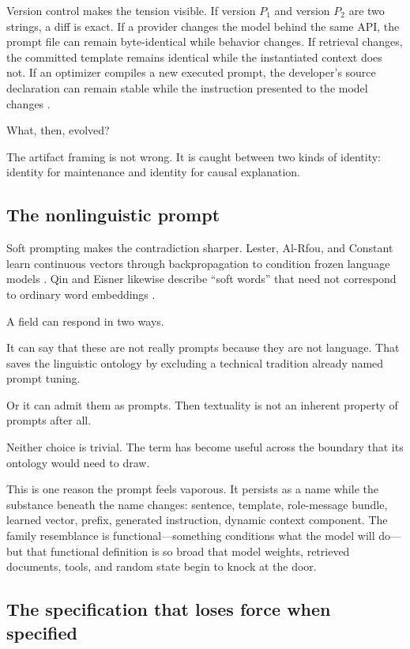 \documentclass[11pt]{article}
\begin{document}
Version control makes the tension visible. If version \(P_1\) and version \(P_2\) are two strings, a diff is exact. If a provider changes the model behind the same API, the prompt file can remain byte-identical while behavior changes. If retrieval changes, the committed template remains identical while the instantiated context does not. If an optimizer compiles a new executed prompt, the developer's source declaration can remain stable while the instruction presented to the model changes \citep{Khattab2023DSPy}.

What, then, evolved?

The artifact framing is not wrong. It is caught between two kinds of identity: identity for maintenance and identity for causal explanation.

\subsection{The nonlinguistic prompt}

Soft prompting makes the contradiction sharper. Lester, Al-Rfou, and Constant learn continuous vectors through backpropagation to condition frozen language models \citep{Lester2021PromptTuning}. Qin and Eisner likewise describe ``soft words'' that need not correspond to ordinary word embeddings \citep{QinEisner2021SoftPrompts}.

A field can respond in two ways.

It can say that these are not really prompts because they are not language. That saves the linguistic ontology by excluding a technical tradition already named prompt tuning.

Or it can admit them as prompts. Then textuality is not an inherent property of prompts after all.

Neither choice is trivial. The term has become useful across the boundary that its ontology would need to draw.

This is one reason the prompt feels vaporous. It persists as a name while the substance beneath the name changes: sentence, template, role-message bundle, learned vector, prefix, generated instruction, dynamic context component. The family resemblance is functional---something conditions what the model will do---but that functional definition is so broad that model weights, retrieved documents, tools, and random state begin to knock at the door.

\subsection{The specification that loses force when specified}
\end{document}
